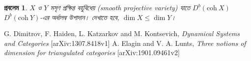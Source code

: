 \documentclass[a4paper,11pt]{amsart}
\newtheorem{prob}[prop]{\bnc প্রবলেম}
\begin{document}
\begin{prob}
\bn $X$ ও $Y$  মসৃণ প্রক্ষিপ্ত বহুবিধেয় (smooth projective variety) যাতে $D^b(\text{coh}~X)$ $D^b(\text{coh}~Y)$-এর অর্ধালম্ব উপাদান। দেখাতে হবে, $\dim X\leq \dim Y$।
\end{prob}



 \begin{thebibliography}{99}
%
 G. Dimitrov, F. Haiden, L. Katzarkov and M. Kontsevich, \textit{Dynamical Systems and Categories} [arXiv:1307.8418v1]
 A. Elagin and V. A. Lunts, \textit{Three notions of dimension for triangulated categories} [arXiv:1901.09461v2]
\end{thebibliography}
\end{document}
